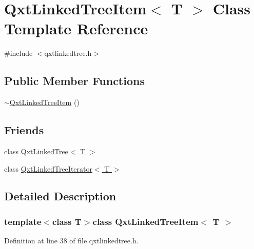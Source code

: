 \hypertarget{class_qxt_linked_tree_item}{\section{Qxt\-Linked\-Tree\-Item$<$ T $>$ Class Template Reference}
\label{class_qxt_linked_tree_item}
}


{\ttfamily \#include $<$qxtlinkedtree.\-h$>$}

\subsection*{Public Member Functions}
\begin{DoxyCompactItemize}
\item 
\hyperlink{class_qxt_linked_tree_item_ad310e900876f1144fccd8664c08a7fbf}{$\sim$\-Qxt\-Linked\-Tree\-Item} ()
\end{DoxyCompactItemize}
\subsection*{Friends}
\begin{DoxyCompactItemize}
\item 
class \hyperlink{class_qxt_linked_tree_item_a88b1d689e62c4e66d7bac155bd0de6a1}{Qxt\-Linked\-Tree$<$ T $>$}
\item 
class \hyperlink{class_qxt_linked_tree_item_a7e867f434f4b033dd98b44bfe275a134}{Qxt\-Linked\-Tree\-Iterator$<$ T $>$}
\end{DoxyCompactItemize}


\subsection{Detailed Description}
\subsubsection*{template$<$class T$>$class Qxt\-Linked\-Tree\-Item$<$ T $>$}



Definition at line 38 of file qxtlinkedtree.\-h.



